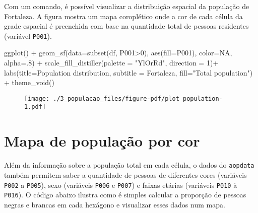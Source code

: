 \documentclass[
  letterpaper,
  DIV=11,
  numbers=noendperiod]{scrreprt}
\newenvironment{Shaded}{\begin{snugshade}}{\end{snugshade}}
\newcommand{\AttributeTok}[1]{\textcolor[rgb]{0.40,0.45,0.13}{#1}}
\newcommand{\ConstantTok}[1]{\textcolor[rgb]{0.56,0.35,0.01}{#1}}
\newcommand{\DecValTok}[1]{\textcolor[rgb]{0.68,0.00,0.00}{#1}}
\newcommand{\FunctionTok}[1]{\textcolor[rgb]{0.28,0.35,0.67}{#1}}
\newcommand{\NormalTok}[1]{\textcolor[rgb]{0.00,0.23,0.31}{#1}}
\newcommand{\SpecialCharTok}[1]{\textcolor[rgb]{0.37,0.37,0.37}{#1}}
\newcommand{\StringTok}[1]{\textcolor[rgb]{0.13,0.47,0.30}{#1}}
\begin{document}
Com um comando, é possível visualizar a distribuição espacial da
população de Fortaleza. A figura mostra um mapa coroplético onde a cor
de cada célula da grade espacial é preenchida com base na quantidade
total de pessoas residentes (variável \texttt{P001}).

\begin{Shaded}
\begin{Highlighting}[]
\FunctionTok{ggplot}\NormalTok{() }\SpecialCharTok{+}
  \FunctionTok{geom\_sf}\NormalTok{(}\AttributeTok{data=}\FunctionTok{subset}\NormalTok{(df, P001}\SpecialCharTok{\textgreater{}}\DecValTok{0}\NormalTok{), }\FunctionTok{aes}\NormalTok{(}\AttributeTok{fill=}\NormalTok{P001), }\AttributeTok{color=}\ConstantTok{NA}\NormalTok{, }\AttributeTok{alpha=}\NormalTok{.}\DecValTok{8}\NormalTok{) }\SpecialCharTok{+}
  \FunctionTok{scale\_fill\_distiller}\NormalTok{(}\AttributeTok{palette =} \StringTok{"YlOrRd"}\NormalTok{, }\AttributeTok{direction =} \DecValTok{1}\NormalTok{)}\SpecialCharTok{+}
  \FunctionTok{labs}\NormalTok{(}\AttributeTok{title=}\StringTok{\textquotesingle{}Population distribution\textquotesingle{}}\NormalTok{, }
       \AttributeTok{subtitle =} \StringTok{\textquotesingle{}Fortaleza\textquotesingle{}}\NormalTok{, }\AttributeTok{fill=}\StringTok{"Total population"}\NormalTok{) }\SpecialCharTok{+}
  \FunctionTok{theme\_void}\NormalTok{()}
\end{Highlighting}
\end{Shaded}

\begin{figure}[H]

{\centering \texttt{[image: ./3\_populacao\_files/figure-pdf/plot population-1.pdf]}

}

\end{figure}

\hypertarget{mapa-de-populauxe7uxe3o-por-cor}{%
\section{Mapa de população por
cor}\label{mapa-de-populauxe7uxe3o-por-cor}}

Além da informação sobre a população total em cada célula, o dados do
\texttt{aopdata} também permitem saber a quantidade de pessoas de
diferentes cores (variáveis \texttt{P002} a \texttt{P005}), sexo
(variáveis \texttt{P006} e \texttt{P007}) e faixas etárias (variáveis
\texttt{P010} à \texttt{P016}). O código abaixo ilustra como é simples
calcular a proporção de pessoas negras e brancas em cada hexágono e
visualizar esses dados num mapa.
\end{document}
